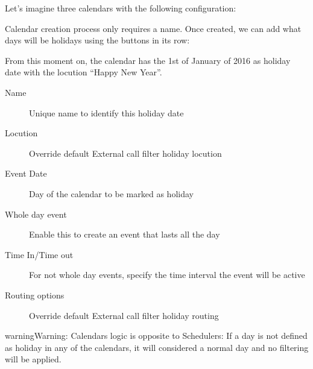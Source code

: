 \documentclass[letterpaper,10pt,english]{sphinxmanual}
\begin{document}
Let's imagine three calendars with the following configuration:

Calendar creation process only requires a name. Once created, we can add what
days will be holidays using the buttons in its row:

From this moment on, the calendar has the 1st of January of 2016 as holiday
date with the locution ``Happy New Year''.
\begin{description}
\item[{Name}] \leavevmode{}\label{administration_portal/client/vpbx/routing_tools/calendars:term-name}
Unique name to identify this holiday date

\item[{Locution}] \leavevmode{}\label{administration_portal/client/vpbx/routing_tools/calendars:term-locution}
Override default External call filter holiday locution

\item[{Event Date}] \leavevmode{}\label{administration_portal/client/vpbx/routing_tools/calendars:term-event-date}
Day of the calendar to be marked as holiday

\item[{Whole day event}] \leavevmode{}\label{administration_portal/client/vpbx/routing_tools/calendars:term-whole-day-event}
Enable this to create an event that lasts all the day

\item[{Time In/Time out}] \leavevmode{}\label{administration_portal/client/vpbx/routing_tools/calendars:term-time-in-time-out}
For not whole day events, specify the time interval the event will be active

\item[{Routing options}] \leavevmode{}\label{administration_portal/client/vpbx/routing_tools/calendars:term-routing-options}
Override default External call filter holiday routing

\end{description}

\begin{notice}{warning}{Warning:}
Calendars logic is opposite to Schedulers: If a day is not defined
as holiday in any of the calendars, it will considered a normal day and no
filtering will be applied.
\end{notice}
\end{document}
